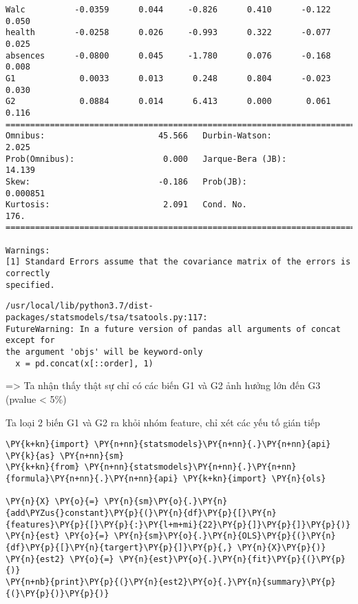 \begin{Verbatim}[commandchars=\\\{\}]
Walc          -0.0359      0.044     -0.826      0.410      -0.122       0.050
health        -0.0258      0.026     -0.993      0.322      -0.077       0.025
absences      -0.0800      0.045     -1.780      0.076      -0.168       0.008
G1             0.0033      0.013      0.248      0.804      -0.023       0.030
G2             0.0884      0.014      6.413      0.000       0.061       0.116
==============================================================================
Omnibus:                       45.566   Durbin-Watson:                   2.025
Prob(Omnibus):                  0.000   Jarque-Bera (JB):               14.139
Skew:                          -0.186   Prob(JB):                     0.000851
Kurtosis:                       2.091   Cond. No.                         176.
==============================================================================

Warnings:
[1] Standard Errors assume that the covariance matrix of the errors is correctly
specified.
    \end{Verbatim}

    \begin{Verbatim}[commandchars=\\\{\}]
/usr/local/lib/python3.7/dist-packages/statsmodels/tsa/tsatools.py:117:
FutureWarning: In a future version of pandas all arguments of concat except for
the argument 'objs' will be keyword-only
  x = pd.concat(x[::order], 1)
    \end{Verbatim}

    =\textgreater{} Ta nhận thấy thật sự chỉ có các biến G1 và G2 ảnh hưởng
lớn đến G3 (pvalue \textless{} 5\%)

    Ta loại 2 biến G1 và G2 ra khỏi nhóm feature, chỉ xét các yếu tố gián
tiếp

    \begin{tcolorbox}[breakable, size=fbox, boxrule=1pt, pad at break*=1mm,colback=cellbackground, colframe=cellborder]
\begin{Verbatim}[commandchars=\\\{\}]
\PY{k+kn}{import} \PY{n+nn}{statsmodels}\PY{n+nn}{.}\PY{n+nn}{api} \PY{k}{as} \PY{n+nn}{sm}
\PY{k+kn}{from} \PY{n+nn}{statsmodels}\PY{n+nn}{.}\PY{n+nn}{formula}\PY{n+nn}{.}\PY{n+nn}{api} \PY{k+kn}{import} \PY{n}{ols}

\PY{n}{X} \PY{o}{=} \PY{n}{sm}\PY{o}{.}\PY{n}{add\PYZus{}constant}\PY{p}{(}\PY{n}{df}\PY{p}{[}\PY{n}{features}\PY{p}{[}\PY{p}{:}\PY{l+m+mi}{22}\PY{p}{]}\PY{p}{]}\PY{p}{)}
\PY{n}{est} \PY{o}{=} \PY{n}{sm}\PY{o}{.}\PY{n}{OLS}\PY{p}{(}\PY{n}{df}\PY{p}{[}\PY{n}{targert}\PY{p}{]}\PY{p}{,} \PY{n}{X}\PY{p}{)}
\PY{n}{est2} \PY{o}{=} \PY{n}{est}\PY{o}{.}\PY{n}{fit}\PY{p}{(}\PY{p}{)}
\PY{n+nb}{print}\PY{p}{(}\PY{n}{est2}\PY{o}{.}\PY{n}{summary}\PY{p}{(}\PY{p}{)}\PY{p}{)}
\end{Verbatim}
\end{tcolorbox}

